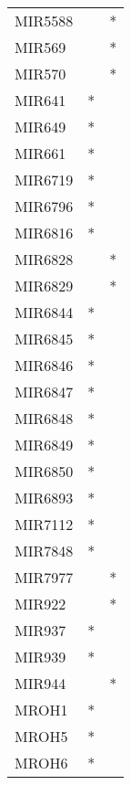 \begin{longtable}{lcc}
MIR5588          &                &          * \\
MIR569           &                &          * \\
MIR570           &                &          * \\
MIR641           &              * &            \\
MIR649           &              * &            \\
MIR661           &              * &            \\
MIR6719          &              * &            \\
MIR6796          &              * &            \\
MIR6816          &              * &            \\
MIR6828          &                &          * \\
MIR6829          &                &          * \\
MIR6844          &              * &            \\
MIR6845          &              * &            \\
MIR6846          &              * &            \\
MIR6847          &              * &            \\
MIR6848          &              * &            \\
MIR6849          &              * &            \\
MIR6850          &              * &            \\
MIR6893          &              * &            \\
MIR7112          &              * &            \\
MIR7848          &              * &            \\
MIR7977          &                &          * \\
MIR922           &                &          * \\
MIR937           &              * &            \\
MIR939           &              * &            \\
MIR944           &                &          * \\
MROH1            &              * &            \\
MROH5            &              * &            \\
MROH6            &              * &            \\

\end{longtable}
